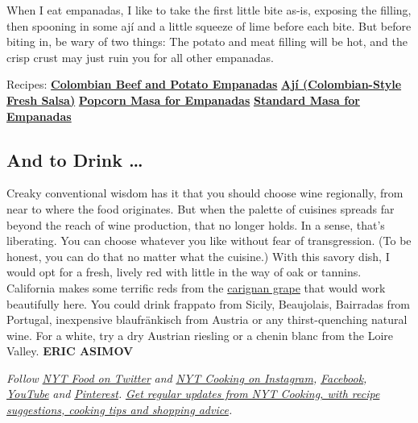 When I eat empanadas, I like to take the first little bite as-is,
exposing the filling, then spooning in some ají and a little squeeze of
lime before each bite. But before biting in, be wary of two things: The
potato and meat filling will be hot, and the crisp crust may just ruin
you for all other empanadas.

Recipes:
\textbf{\href{https://cooking.nytimes3xbfgragh.onion/recipes/1021300-colombian-beef-and-potato-empanadas}{Colombian
Beef and Potato Empanadas}} \textbar{}
\textbf{\href{https://cooking.nytimes3xbfgragh.onion/recipes/1021299-aji-colombian-style-fresh-salsa}{Ají
(Colombian-Style Fresh Salsa)}} \textbar{}
\textbf{\href{https://cooking.nytimes3xbfgragh.onion/recipes/1021301-popcorn-masa-for-empanadas}{Popcorn
Masa for Empanadas}} \textbar{}
\textbf{\href{https://cooking.nytimes3xbfgragh.onion/recipes/1021302-standard-masa-for-empanadas}{Standard
Masa for Empanadas}}

\hypertarget{and-to-drink-}{%
\subsection{And to Drink \ldots{}}\label{and-to-drink-}}

Creaky conventional wisdom has it that you should choose wine
regionally, from near to where the food originates. But when the palette
of cuisines spreads far beyond the reach of wine production, that no
longer holds. In a sense, that's liberating. You can choose whatever you
like without fear of transgression. (To be honest, you can do that no
matter what the cuisine.) With this savory dish, I would opt for a
fresh, lively red with little in the way of oak or tannins. California
makes some terrific reds from the
\href{https://www.nytimes3xbfgragh.onion/2018/11/26/dining/drinks/wine-school-carignan.html}{carignan
grape} that would work beautifully here. You could drink frappato from
Sicily, Beaujolais, Bairradas from Portugal, inexpensive blaufränkisch
from Austria or any thirst-quenching natural wine. For a white, try a
dry Austrian riesling or a chenin blanc from the Loire Valley.
\textbf{ERIC ASIMOV}

\emph{Follow} \href{https://twitter.com/nytfood}{\emph{NYT Food on
Twitter}} \emph{and}
\href{https://www.instagram.com/nytcooking/}{\emph{NYT Cooking on
Instagram}}\emph{,}
\href{https://www.facebookcorewwwi.onion/nytcooking/}{\emph{Facebook}}\emph{,}
\href{https://www.youtube.com/nytcooking}{\emph{YouTube}} \emph{and}
\href{https://www.pinterest.com/nytcooking/}{\emph{Pinterest}}\emph{.}
\href{https://www.nytimes3xbfgragh.onion/newsletters/cooking}{\emph{Get
regular updates from NYT Cooking, with recipe suggestions, cooking tips
and shopping advice}}\emph{.}

